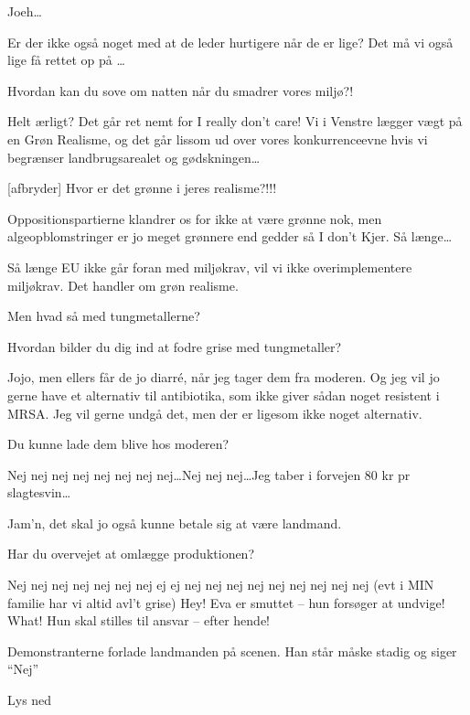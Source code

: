 \documentclass[a4paper,11pt]{article}
\begin{document}
\begin{sketch}
 Joeh\ldots

 Er der ikke også noget med at de leder hurtigere når de er lige? Det må vi også lige få rettet op på \ldots


Hvordan kan du sove om natten når du smadrer vores miljø?!

Helt ærligt? Det går ret nemt for I really don’t care! Vi i Venstre lægger vægt på en Grøn Realisme, og det går lissom ud over vores konkurrenceevne hvis vi begrænser landbrugsarealet og gødskningen\ldots

[afbryder] Hvor er det grønne i jeres realisme?!!!

Oppositionspartierne klandrer os for ikke at være grønne nok, men algeopblomstringer er jo meget grønnere end gedder så I don’t Kjer. Så længe…


Så længe EU ikke går foran med miljøkrav, vil vi ikke overimplementere miljøkrav. Det handler om grøn realisme.

Men hvad så med tungmetallerne?

 Hvordan bilder du dig ind at fodre grise med tungmetaller?

 Jojo, men ellers får de jo diarré, når jeg tager dem fra moderen. Og jeg vil jo gerne have et alternativ til antibiotika, som ikke giver sådan noget resistent i MRSA. Jeg vil gerne undgå det, men der er ligesom ikke noget alternativ.

Du kunne lade dem blive hos moderen?

Nej nej nej nej nej nej nej nej\ldots Nej nej nej\ldots Jeg taber i forvejen 80 kr pr slagtesvin\ldots

 Jam'n, det skal jo også kunne betale sig at være landmand.


Har du overvejet at omlægge produktionen?

Nej nej nej nej nej nej nej ej ej nej nej nej nej nej nej nej nej nej (evt i MIN familie har vi altid avl't grise)
Hey! Eva er smuttet -- hun forsøger at undvige!
 What! Hun skal stilles til ansvar -- efter hende!

\scene Demonstranterne forlade landmanden på scenen. Han står måske stadig og siger ``Nej''

\scene Lys ned














\end{sketch}
\end{document}
